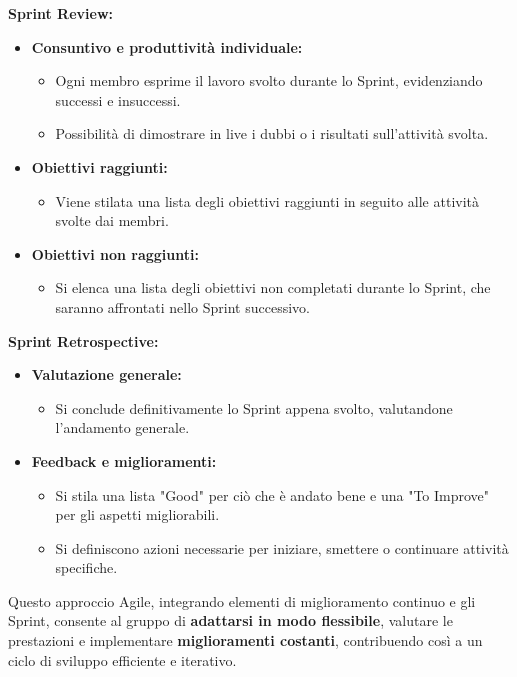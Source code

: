 \documentclass{article}
\begin{document}
\textbf{Sprint Review:}

\begin{itemize}
    \item \textbf{Consuntivo e produttività individuale:}
    \begin{itemize}
        \item Ogni membro esprime il lavoro svolto durante lo Sprint, evidenziando successi e insuccessi.
        \item Possibilità di dimostrare in live i dubbi o i risultati sull'attività svolta.
    \end{itemize}
    \item \textbf{Obiettivi raggiunti:}
    \begin{itemize}
        \item Viene stilata una lista degli obiettivi raggiunti in seguito alle attività svolte dai membri.
    \end{itemize}
    \item \textbf{Obiettivi non raggiunti:}
    \begin{itemize}
        \item Si elenca una lista degli obiettivi non completati durante lo Sprint, che saranno affrontati nello Sprint successivo.
    \end{itemize}
\end{itemize}

\textbf{Sprint Retrospective:}

\begin{itemize}
    \item \textbf{Valutazione generale:}
    \begin{itemize}
        \item Si conclude definitivamente lo Sprint appena svolto, valutandone l'andamento generale.
    \end{itemize}
    \item \textbf{Feedback e miglioramenti:}
    \begin{itemize}
        \item Si stila una lista "Good" per ciò che è andato bene e una "To Improve" per gli aspetti migliorabili.
        \item Si definiscono azioni necessarie per iniziare, smettere o continuare attività specifiche.
    \end{itemize}
\end{itemize}

Questo approccio Agile, integrando elementi di miglioramento continuo e gli Sprint, consente al gruppo di \textbf{adattarsi in modo flessibile}, valutare le prestazioni e implementare \textbf{miglioramenti costanti}, contribuendo così a un ciclo di sviluppo efficiente e iterativo.
\end{document}
